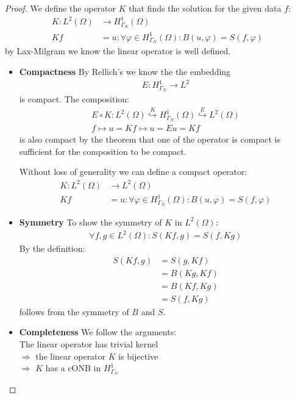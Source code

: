 \documentclass[a4paper,11pt,oneside,fleqn]{book}
\theoremstyle{definition}
\theoremstyle{remark}
\begin{document}
\begin{proof}
We define the operator $K$ that finds the solution for the given data $f$:
\begin{align*}
	K: L^2(\Omega) &\rightarrow H^1_{\Gamma_N}(\Omega) \\
	Kf &= u :\forall \varphi\in H^1_{\Gamma_N}(\Omega):  B(u, \varphi) = S(f, \varphi) \
\end{align*}
by Lax-Milgram we know the linear operator is well defined.
\begin{itemize}
	\item \textbf{Compactness}
	By Rellich's we know the the embedding
	\begin{align*}
		E: H^1_{\Gamma_N} \rightarrow L^2
	\end{align*}
	is compact. 
	The composition:
	\begin{align*}
		E \circ K: L^2(\Omega) \overset{K}{\hookrightarrow} H^1_{\Gamma_N}(\Omega) \overset{E}{\hookrightarrow} L^2(\Omega)\\
		f \mapsto u = Kf  \mapsto u= Eu = Kf
	\end{align*}
	is also compact by the theorem that one of the operator is compact is sufficient for the composition to be compact.\par
	Without loss of generality we can define a compact operator:
	\begin{align*}
		K: L^2(\Omega) &\rightarrow L^2(\Omega)\\
		Kf &= u: \forall \varphi \in H^1_{\Gamma_N}(\Omega): B(u, \varphi) = S(f, \varphi)
	\end{align*}
	\item \textbf{Symmetry}
	To show the symmetry of $K$ in $L^2(\Omega)$:
	\begin{align*}
		\forall f, g \in L^2(\Omega):  S(Kf, g) = S(f, Kg)
	\end{align*}
	By the definition:
	\begin{align*}
		S(Kf, g) &= S(g, Kf) \\
		&= B(Kg, Kf)\\
		&= B(Kf, Kg)\\
		&= S(f, Kg)
	\end{align*}
	follows from the symmetry of $B$ and $S$. 
	\item \textbf{Completeness}
	We follow the arguments:\\
	The linear operator has trivial kernel\\
	$\Rightarrow$ the linear operator $K$ is bijective\\
	$\Rightarrow$ $K$ has a cONB in $H^1_{\Gamma_N}$\\

\end{itemize}
\end{proof}
\end{document}

